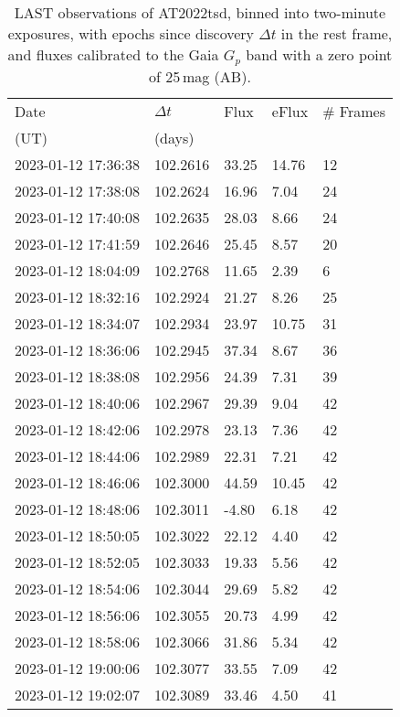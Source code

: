 \documentclass{nature_plusfigure}
\begin{document}
\begin{supplement}
\clearpage

\begin{center} 
\begin{longtable}{lllll} 
\caption{LAST observations of AT2022tsd, binned into two-minute exposures, with epochs since discovery $\Delta t$ in the rest frame, and fluxes calibrated to the Gaia $G_p$ band with a zero point of 25\,mag (AB).} 
\label{tab:last-photometry}\\ 
\hline\hline
Date & $\Delta t$ & Flux & eFlux & \# Frames\\ 
(UT) & (days) &  &  & \\ 
\hline
2023-01-12 17:36:38 & 102.2616 & 33.25 & 14.76 & 12 \\ 
2023-01-12 17:38:08 & 102.2624 & 16.96 & 7.04 & 24 \\ 
2023-01-12 17:40:08 & 102.2635 & 28.03 & 8.66 & 24 \\ 
2023-01-12 17:41:59 & 102.2646 & 25.45 & 8.57 & 20 \\ 
2023-01-12 18:04:09 & 102.2768 & 11.65 & 2.39 & 6 \\ 
2023-01-12 18:32:16 & 102.2924 & 21.27 & 8.26 & 25 \\ 
2023-01-12 18:34:07 & 102.2934 & 23.97 & 10.75 & 31 \\ 
2023-01-12 18:36:06 & 102.2945 & 37.34 & 8.67 & 36 \\ 
2023-01-12 18:38:08 & 102.2956 & 24.39 & 7.31 & 39 \\ 
2023-01-12 18:40:06 & 102.2967 & 29.39 & 9.04 & 42 \\ 
2023-01-12 18:42:06 & 102.2978 & 23.13 & 7.36 & 42 \\ 
2023-01-12 18:44:06 & 102.2989 & 22.31 & 7.21 & 42 \\ 
2023-01-12 18:46:06 & 102.3000 & 44.59 & 10.45 & 42 \\ 
2023-01-12 18:48:06 & 102.3011 & -4.80 & 6.18 & 42 \\ 
2023-01-12 18:50:05 & 102.3022 & 22.12 & 4.40 & 42 \\ 
2023-01-12 18:52:05 & 102.3033 & 19.33 & 5.56 & 42 \\ 
2023-01-12 18:54:06 & 102.3044 & 29.69 & 5.82 & 42 \\ 
2023-01-12 18:56:06 & 102.3055 & 20.73 & 4.99 & 42 \\ 
2023-01-12 18:58:06 & 102.3066 & 31.86 & 5.34 & 42 \\ 
2023-01-12 19:00:06 & 102.3077 & 33.55 & 7.09 & 42 \\ 
2023-01-12 19:02:07 & 102.3089 & 33.46 & 4.50 & 41 \\ 

\end{longtable}
\end{center}
\end{supplement}
\end{document}
